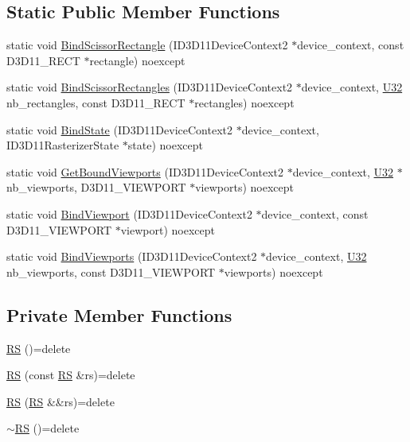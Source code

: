 \subsection*{Static Public Member Functions}
\begin{DoxyCompactItemize}
\item 
static void \hyperlink{structmage_1_1_pipeline_1_1_r_s_a28be63e6e29c73316854301243d7064e}{Bind\+Scissor\+Rectangle} (I\+D3\+D11\+Device\+Context2 $\ast$device\+\_\+context, const D3\+D11\+\_\+\+R\+E\+CT $\ast$rectangle) noexcept
\item 
static void \hyperlink{structmage_1_1_pipeline_1_1_r_s_afd697118fbb9c47709a9335722d9f105}{Bind\+Scissor\+Rectangles} (I\+D3\+D11\+Device\+Context2 $\ast$device\+\_\+context, \hyperlink{namespacemage_a41c104c036fba3756a74e19f793eeaa1}{U32} nb\+\_\+rectangles, const D3\+D11\+\_\+\+R\+E\+CT $\ast$rectangles) noexcept
\item 
static void \hyperlink{structmage_1_1_pipeline_1_1_r_s_a1bb922e09c6b1d11fa87a84379f0d91a}{Bind\+State} (I\+D3\+D11\+Device\+Context2 $\ast$device\+\_\+context, I\+D3\+D11\+Rasterizer\+State $\ast$state) noexcept
\item 
static void \hyperlink{structmage_1_1_pipeline_1_1_r_s_a8bc4e69d0786d5754cb2cf64c1045433}{Get\+Bound\+Viewports} (I\+D3\+D11\+Device\+Context2 $\ast$device\+\_\+context, \hyperlink{namespacemage_a41c104c036fba3756a74e19f793eeaa1}{U32} $\ast$nb\+\_\+viewports, D3\+D11\+\_\+\+V\+I\+E\+W\+P\+O\+RT $\ast$viewports) noexcept
\item 
static void \hyperlink{structmage_1_1_pipeline_1_1_r_s_a925570347f6516c2c0d08f9262afec26}{Bind\+Viewport} (I\+D3\+D11\+Device\+Context2 $\ast$device\+\_\+context, const D3\+D11\+\_\+\+V\+I\+E\+W\+P\+O\+RT $\ast$viewport) noexcept
\item 
static void \hyperlink{structmage_1_1_pipeline_1_1_r_s_ad0dcbcbfdefcadd793f7a9417534f0cf}{Bind\+Viewports} (I\+D3\+D11\+Device\+Context2 $\ast$device\+\_\+context, \hyperlink{namespacemage_a41c104c036fba3756a74e19f793eeaa1}{U32} nb\+\_\+viewports, const D3\+D11\+\_\+\+V\+I\+E\+W\+P\+O\+RT $\ast$viewports) noexcept
\end{DoxyCompactItemize}
\subsection*{Private Member Functions}
\begin{DoxyCompactItemize}
\item 
\hyperlink{structmage_1_1_pipeline_1_1_r_s_a5d2920325973d503fee6137b45835503}{RS} ()=delete
\item 
\hyperlink{structmage_1_1_pipeline_1_1_r_s_a264dbb8473ad4a286112aa525e2a3018}{RS} (const \hyperlink{structmage_1_1_pipeline_1_1_r_s}{RS} \&rs)=delete
\item 
\hyperlink{structmage_1_1_pipeline_1_1_r_s_a5aca2e871b4a7133bb49b98f28a2ef9e}{RS} (\hyperlink{structmage_1_1_pipeline_1_1_r_s}{RS} \&\&rs)=delete
\item 
\hyperlink{structmage_1_1_pipeline_1_1_r_s_a3a6900db36fe13ce2ddd6375314d5bc6}{$\sim$\+RS} ()=delete
\end{DoxyCompactItemize}


